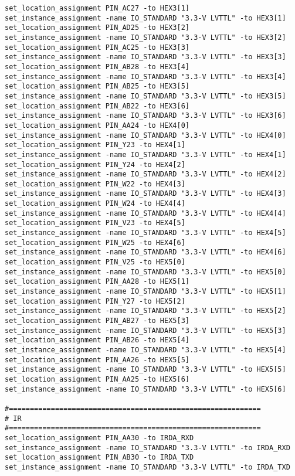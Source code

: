 \documentclass[dvipdfm]{book}
\begin{document}
\begin{verbatim}
set_location_assignment PIN_AC27 -to HEX3[1]
set_instance_assignment -name IO_STANDARD "3.3-V LVTTL" -to HEX3[1]
set_location_assignment PIN_AD25 -to HEX3[2]
set_instance_assignment -name IO_STANDARD "3.3-V LVTTL" -to HEX3[2]
set_location_assignment PIN_AC25 -to HEX3[3]
set_instance_assignment -name IO_STANDARD "3.3-V LVTTL" -to HEX3[3]
set_location_assignment PIN_AB28 -to HEX3[4]
set_instance_assignment -name IO_STANDARD "3.3-V LVTTL" -to HEX3[4]
set_location_assignment PIN_AB25 -to HEX3[5]
set_instance_assignment -name IO_STANDARD "3.3-V LVTTL" -to HEX3[5]
set_location_assignment PIN_AB22 -to HEX3[6]
set_instance_assignment -name IO_STANDARD "3.3-V LVTTL" -to HEX3[6]
set_location_assignment PIN_AA24 -to HEX4[0]
set_instance_assignment -name IO_STANDARD "3.3-V LVTTL" -to HEX4[0]
set_location_assignment PIN_Y23 -to HEX4[1]
set_instance_assignment -name IO_STANDARD "3.3-V LVTTL" -to HEX4[1]
set_location_assignment PIN_Y24 -to HEX4[2]
set_instance_assignment -name IO_STANDARD "3.3-V LVTTL" -to HEX4[2]
set_location_assignment PIN_W22 -to HEX4[3]
set_instance_assignment -name IO_STANDARD "3.3-V LVTTL" -to HEX4[3]
set_location_assignment PIN_W24 -to HEX4[4]
set_instance_assignment -name IO_STANDARD "3.3-V LVTTL" -to HEX4[4]
set_location_assignment PIN_V23 -to HEX4[5]
set_instance_assignment -name IO_STANDARD "3.3-V LVTTL" -to HEX4[5]
set_location_assignment PIN_W25 -to HEX4[6]
set_instance_assignment -name IO_STANDARD "3.3-V LVTTL" -to HEX4[6]
set_location_assignment PIN_V25 -to HEX5[0]
set_instance_assignment -name IO_STANDARD "3.3-V LVTTL" -to HEX5[0]
set_location_assignment PIN_AA28 -to HEX5[1]
set_instance_assignment -name IO_STANDARD "3.3-V LVTTL" -to HEX5[1]
set_location_assignment PIN_Y27 -to HEX5[2]
set_instance_assignment -name IO_STANDARD "3.3-V LVTTL" -to HEX5[2]
set_location_assignment PIN_AB27 -to HEX5[3]
set_instance_assignment -name IO_STANDARD "3.3-V LVTTL" -to HEX5[3]
set_location_assignment PIN_AB26 -to HEX5[4]
set_instance_assignment -name IO_STANDARD "3.3-V LVTTL" -to HEX5[4]
set_location_assignment PIN_AA26 -to HEX5[5]
set_instance_assignment -name IO_STANDARD "3.3-V LVTTL" -to HEX5[5]
set_location_assignment PIN_AA25 -to HEX5[6]
set_instance_assignment -name IO_STANDARD "3.3-V LVTTL" -to HEX5[6]

#============================================================
# IR
#============================================================
set_location_assignment PIN_AA30 -to IRDA_RXD
set_instance_assignment -name IO_STANDARD "3.3-V LVTTL" -to IRDA_RXD
set_location_assignment PIN_AB30 -to IRDA_TXD
set_instance_assignment -name IO_STANDARD "3.3-V LVTTL" -to IRDA_TXD


\end{verbatim}
\end{document}
